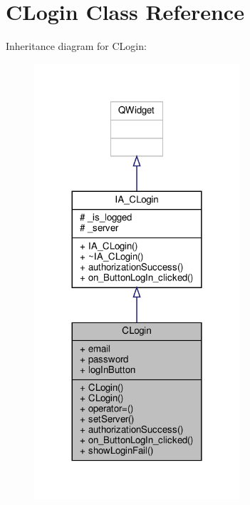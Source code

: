\hypertarget{classCLogin}{}\section{C\+Login Class Reference}
\label{classCLogin}


Inheritance diagram for C\+Login\+:
\nopagebreak
\begin{figure}[H]
\begin{center}
\leavevmode
\includegraphics[width=216pt]{classCLogin__inherit__graph}
\end{center}
\end{figure}


